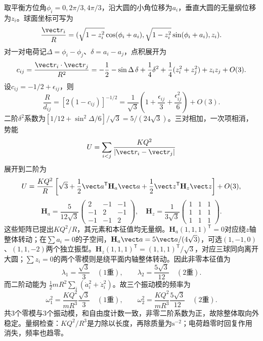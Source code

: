 \begin{xesolution}
取平衡方位角$\phi_i=0,2\pi/3,4\pi/3$，沿大圆的小角位移为$a_i$，垂直大圆的无量纲位移为$z_i$。球面坐标可写为
\[
 \frac{\vect r_i}{R}=(\sqrt{1-z_i^2}\cos(\phi_i+a_i),
 \sqrt{1-z_i^2}\sin(\phi_i+a_i),z_i).
\]
对一对电荷记$\Delta=\phi_i-\phi_j$、$\delta=a_i-a_j$，点积展开为
\[
 c_{ij}=\frac{\vect r_i\cdot\vect r_j}{R^2}
 =-\frac12-\sin\Delta\,\delta+\frac14\delta^2
 +\frac14(z_i^2+z_j^2)+z_iz_j+O(3).
\]
设$c_{ij}=-1/2+\epsilon_{ij}$，则
\[
 \frac R{d_{ij}}=[2(1-c_{ij})]^{-1/2}
 =\frac1{\sqrt3}\left(1+\frac{\epsilon_{ij}}3+\frac{\epsilon_{ij}^2}{6}\right)+O(3).
\]
二阶$\delta^2$系数为$[1/12+\sin^2\Delta/6]/\sqrt3=5/(24\sqrt3)$。三对相加，一次项相消，势能
\[
 U=\sum_{i<j}\frac{KQ^2}{|\vect r_i-\vect r_j|}
\]
展开到二阶为
\[
 U=\frac{KQ^2}{R}\left[\sqrt3+\frac12\vect a^{\mathsf T}\mathbf H_a\vect a
 +\frac12\vect z^{\mathsf T}\mathbf H_z\vect z\right]+O(3),
\]
\[
 \mathbf H_a=\frac5{12\sqrt3}\begin{pmatrix}2&-1&-1\\-1&2&-1\\-1&-1&2\end{pmatrix},\quad
 \mathbf H_z=\frac1{3\sqrt3}\begin{pmatrix}1&1&1\\1&1&1\\1&1&1\end{pmatrix}.
\]
这些矩阵已提出$KQ^2/R$，其元素和本征值均无量纲。$\mathbf H_a(1,1,1)^{\mathsf T}=0$对应绕$z$轴整体转动；在$\sum a_i=0$的子空间，$\mathbf H_a\vect a=5\vect a/(4\sqrt3)$，可选$(1,-1,0)$、$(1,1,-2)$两个独立振型。$\mathbf H_z(1,1,1)^{\mathsf T}=(1,1,1)^{\mathsf T}/\sqrt3$，对应三球同向离开大圆；$\sum z_i=0$的两个零模则是绕平面内轴整体转动。因此非零本征值为
\[
 \lambda_1=\frac{\sqrt3}{3}\quad(1\text{重}),\qquad
 \lambda_2=\frac{5\sqrt3}{12}\quad(2\text{重}).
\]
而二阶动能为 $\tfrac12mR^2\sum_i(\dot a_i^2+\dot z_i^2)$。故三个振动模的频率为
\[
 \boxed{\omega_1^2=\frac{KQ^2}{mR^3}\frac{\sqrt3}{3}}\quad(1\text{重}),
 \qquad
 \boxed{\omega_2^2=\frac{KQ^2}{mR^3}\frac{5\sqrt3}{12}}\quad(2\text{重}).
\]
共3个零模与3个振动模，和自由度计数一致，非零二阶系数为正，故除整体取向外稳定。量纲检查：$KQ^2/R^3$是力除以长度，再除质量为$\mathrm{s^{-2}}$；电荷趋零时回复作用消失，频率也趋零。
\end{xesolution}

